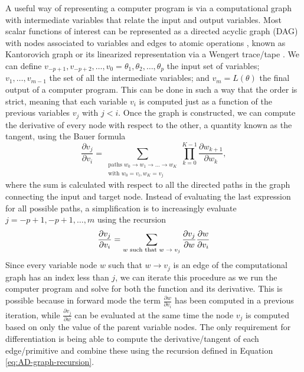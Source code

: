 A useful way of representing a computer program is via a computational graph with intermediate variables that relate the input and output variables. 
Most scalar functions of interest can be represented as a directed acyclic graph (DAG) with nodes associated to variables and edges to atomic operations \cite{Griewank:2008kh, Griewank_1989}, known as Kantorovich graph \cite{kantorovich1957mathematical} or its linearized representation via a Wengert trace/tape \cite{Wengert_1964, Bauer_1974, Griewank:2008kh}. 
We can define $v_{-p+1}, v_{-p+2}, \ldots, v_0 = \theta_1, \theta_2, \ldots, \theta_p$ the input set of variables; $v_{1}, \ldots, v_{m-1}$ the set of all the intermediate variables; and $v_m = L(\theta)$ the final output of a computer program. 
This can be done in such a way that the order is strict, meaning that each variable $v_i$ is computed just as a function of the previous variables $v_j$ with $j < i$. 
Once the graph is constructed, we can compute the derivative of every node with respect to the other, a quantity known as the tangent, using the Bauer formula \cite{Bauer_1974, Oktay_randomized-AD}
\begin{equation}
    \frac{\partial v_j}{\partial v_i}
    = 
    \sum_{\substack{ \text{paths }w_0 \rightarrow w_1 \rightarrow \ldots \rightarrow w_K \\
                    \text{with } w_0=v_i, w_K = v_j}}
    \prod_{k=0}^{K-1} \frac{\partial w_{k+1}}{\partial w_{k}},
\end{equation}
where the sum is calculated with respect to all the directed paths in the graph connecting the input and target node.
Instead of evaluating the last expression for all possible paths, a simplification is to increasingly evaluate $j=-p+1, -p+1, \ldots, m$ using the recursion 
\begin{equation}
    \frac{\partial v_j}{\partial v_i}
    = 
    \sum_\text{$w$\text{ such that} $w \rightarrow v_j$}
    \frac{\partial v_j}{\partial w}
    \frac{\partial w}{\partial v_i} 
    \label{eq:AD-graph-recursion}
\end{equation}
Since every variable node $w$ such that $w \rightarrow v_j$ is an edge of the computational graph has an index less than $j$, we can iterate this procedure as we run the computer program and solve for both the function and its derivative.
This is possible because in forward mode the term $\frac{\partial w}{\partial v_i}$ has been computed in a previous iteration, while $\frac{\partial v_j}{\partial w}$ can be evaluated at the same time the node $v_j$ is computed based on only the value of the parent variable nodes. 
The only requirement for differentiation is being able to compute the derivative/tangent of each edge/primitive and combine these using the recursion defined in Equation \eqref{eq:AD-graph-recursion}.


